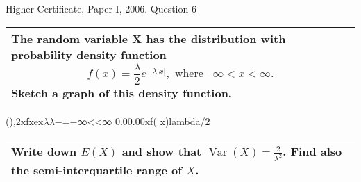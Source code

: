 \documentclass[a4paper,12pt]{article}
\begin{document}
Higher Certificate, Paper I, 2006. Question 6

\begin{table}[ht!]
     
\centering
     
\begin{tabular}{|p{15cm}|}
     
\hline        

\noindent
The random variable X has the distribution with probability density function
\[ f(x) =  \frac{\lambda}{2}  e^{-\lambda |x|},  \mbox{ where } –\infty < x < \infty .\]
Sketch a graph of this density function.
\\ \hline
      
\end{tabular}
    
\end{table}



(),2xfxex$\lambda$$\lambda$−=−∞<<∞
0.00.00xf(
x)lambda/2

\newpage


\begin{table}[ht!]
     
\centering
     
\begin{tabular}{|p{15cm}|}
     
\hline        

\noindent

Write down $E(X)$ and show that $\operatorname{Var}(X) = \frac{2}{\lambda^2}$. Find also the semi-interquartile range of $X$.
\\ \hline
      
\end{tabular}
    
\end{table}
\end{document}
